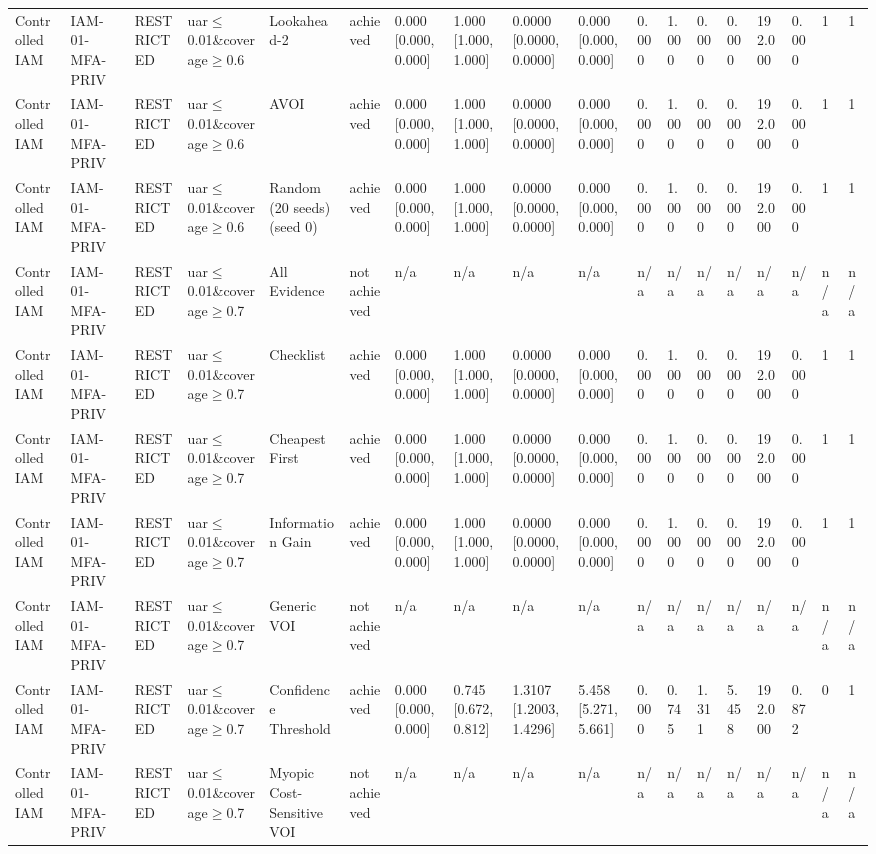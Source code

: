 \begin{table}[!ht]
{\begin{tabular}{llllllllllllllllll}
Controlled IAM & IAM-01-MFA-PRIV & RESTRICTED & uar$\le$0.01\&coverage$\ge$0.6 & Lookahead-2 & achieved & 0.000 [0.000, 0.000] & 1.000 [1.000, 1.000] & 0.0000 [0.0000, 0.0000] & 0.000 [0.000, 0.000] & 0.000 & 1.000 & 0.000 & 0.000 & 192.000 & 0.000 & 1 & 1 \\
Controlled IAM & IAM-01-MFA-PRIV & RESTRICTED & uar$\le$0.01\&coverage$\ge$0.6 & AVOI & achieved & 0.000 [0.000, 0.000] & 1.000 [1.000, 1.000] & 0.0000 [0.0000, 0.0000] & 0.000 [0.000, 0.000] & 0.000 & 1.000 & 0.000 & 0.000 & 192.000 & 0.000 & 1 & 1 \\
Controlled IAM & IAM-01-MFA-PRIV & RESTRICTED & uar$\le$0.01\&coverage$\ge$0.6 & Random (20 seeds) (seed 0) & achieved & 0.000 [0.000, 0.000] & 1.000 [1.000, 1.000] & 0.0000 [0.0000, 0.0000] & 0.000 [0.000, 0.000] & 0.000 & 1.000 & 0.000 & 0.000 & 192.000 & 0.000 & 1 & 1 \\
Controlled IAM & IAM-01-MFA-PRIV & RESTRICTED & uar$\le$0.01\&coverage$\ge$0.7 & All Evidence & not achieved & n/a & n/a & n/a & n/a & n/a & n/a & n/a & n/a & n/a & n/a & n/a & n/a \\
Controlled IAM & IAM-01-MFA-PRIV & RESTRICTED & uar$\le$0.01\&coverage$\ge$0.7 & Checklist & achieved & 0.000 [0.000, 0.000] & 1.000 [1.000, 1.000] & 0.0000 [0.0000, 0.0000] & 0.000 [0.000, 0.000] & 0.000 & 1.000 & 0.000 & 0.000 & 192.000 & 0.000 & 1 & 1 \\
Controlled IAM & IAM-01-MFA-PRIV & RESTRICTED & uar$\le$0.01\&coverage$\ge$0.7 & Cheapest First & achieved & 0.000 [0.000, 0.000] & 1.000 [1.000, 1.000] & 0.0000 [0.0000, 0.0000] & 0.000 [0.000, 0.000] & 0.000 & 1.000 & 0.000 & 0.000 & 192.000 & 0.000 & 1 & 1 \\
Controlled IAM & IAM-01-MFA-PRIV & RESTRICTED & uar$\le$0.01\&coverage$\ge$0.7 & Information Gain & achieved & 0.000 [0.000, 0.000] & 1.000 [1.000, 1.000] & 0.0000 [0.0000, 0.0000] & 0.000 [0.000, 0.000] & 0.000 & 1.000 & 0.000 & 0.000 & 192.000 & 0.000 & 1 & 1 \\
Controlled IAM & IAM-01-MFA-PRIV & RESTRICTED & uar$\le$0.01\&coverage$\ge$0.7 & Generic VOI & not achieved & n/a & n/a & n/a & n/a & n/a & n/a & n/a & n/a & n/a & n/a & n/a & n/a \\
Controlled IAM & IAM-01-MFA-PRIV & RESTRICTED & uar$\le$0.01\&coverage$\ge$0.7 & Confidence Threshold & achieved & 0.000 [0.000, 0.000] & 0.745 [0.672, 0.812] & 1.3107 [1.2003, 1.4296] & 5.458 [5.271, 5.661] & 0.000 & 0.745 & 1.311 & 5.458 & 192.000 & 0.872 & 0 & 1 \\
Controlled IAM & IAM-01-MFA-PRIV & RESTRICTED & uar$\le$0.01\&coverage$\ge$0.7 & Myopic Cost-Sensitive VOI & not achieved & n/a & n/a & n/a & n/a & n/a & n/a & n/a & n/a & n/a & n/a & n/a & n/a \\

\end{tabular}}
\end{table}
